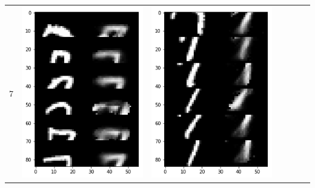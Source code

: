 \documentclass[12pt]{report} %
\begin{document}
\begin{tabular}{m{0.7cm}m{2.4cm}m{2.4cm}m{2.4cm}m{2.4cm}m{2.4cm}m{2.4cm}}
7 & \includegraphics[scale=0.3]{pictures/KE_7_up.png} & \includegraphics[scale=0.3]{pictures/KE_7_down.png} &

\end{tabular}
\end{document}
